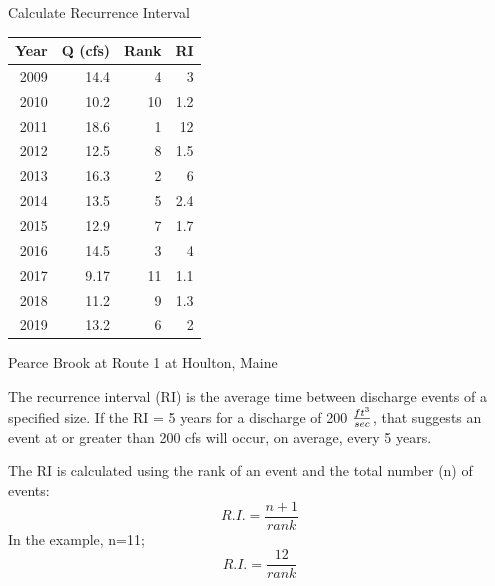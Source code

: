 \documentclass[ignorenonframetext,aspectratio=169]{beamer}
\begin{document}
\begin{frame}{Calculate Recurrence Interval}
  \begin{minipage}{.5\textwidth}
    \begin{tabular}{r r r r}
      Year & Q (cfs) & Rank & RI\\ \hline
      2009 & 14.4    & 4 & 3\\
      2010 & 10.2    & 10& 1.2\\
      2011 & 18.6    & 1 & 12\\
      2012 & 12.5    & 8 & 1.5\\
      2013 & 16.3    & 2 & 6\\
      2014 & 13.5    & 5 & 2.4\\
      2015 & 12.9    & 7 & 1.7\\
      2016 & 14.5    & 3 & 4\\
      2017 & 9.17    & 11& 1.1\\
      2018 & 11.2    & 9 & 1.3\\
      2019 & 13.2    & 6 & 2\\ \hline
    \end{tabular}

    \scriptsize  Pearce Brook at Route 1 at Houlton, Maine
  \end{minipage}
  \begin{minipage}{.48\textwidth}
    The recurrence interval (RI) is the average time between discharge events of a specified size. If the RI = 5 years for a discharge of 200 $ft^3 \over sec$, that suggests an event at or greater than 200 cfs will occur, on average, every 5 years.

    The RI is calculated using the rank of an event and the total number (n) of events:
    \begin{equation}
      R.I. = \frac{n+1}{rank}
    \end{equation}
    In the example, n=11;
    \begin{equation}
      R.I. = \frac{12}{rank}
    \end{equation}
  \end{minipage}
\end{frame}
\end{document}
